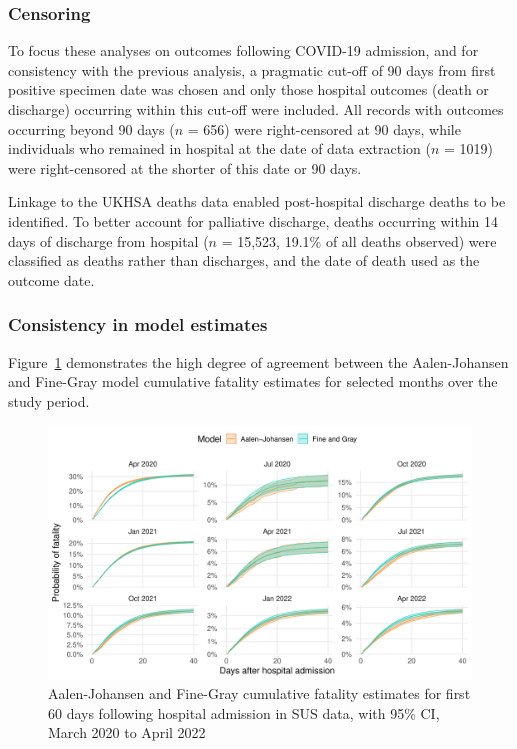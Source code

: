 \subsubsection{Censoring}

To focus these analyses on outcomes following COVID-19 admission, and for consistency with the previous analysis, a pragmatic cut-off of 90 days from first positive specimen date was chosen and only those hospital outcomes (death or discharge) occurring within this cut-off were included. All records with outcomes occurring beyond 90 days ($n$ = 656) were right-censored at 90 days, while individuals who remained in hospital at the date of data extraction ($n$ = 1019) were right-censored at the shorter of this date or 90 days.

Linkage to the UKHSA deaths data enabled post-hospital discharge deaths to be identified. To better account for palliative discharge, deaths occurring within 14 days of discharge from hospital ($n$ = 15,523, 19.1\% of all deaths observed) were classified as deaths rather than discharges, and the date of death used as the outcome date.

\subsubsection{Consistency in model estimates}

Figure~\ref{fig:fg_aj_comparison} demonstrates the high degree of agreement between the Aalen-Johansen and Fine-Gray model cumulative fatality estimates for selected months over the study period.

\begin{figure}[htbp!]
    \centering
    \includegraphics[width=\textwidth]{fg_aj_month_comparison.pdf}
    \caption[Aalen-Johansen and Fine-Gray cumulative fatality estimates for first 60 days following hospital admission in SUS data, March 2020 to April 2022]{Aalen-Johansen and Fine-Gray cumulative fatality estimates for first 60 days following hospital admission in SUS data, with 95\% CI, March 2020 to April 2022}\label{fig:fg_aj_comparison}
\end{figure}

